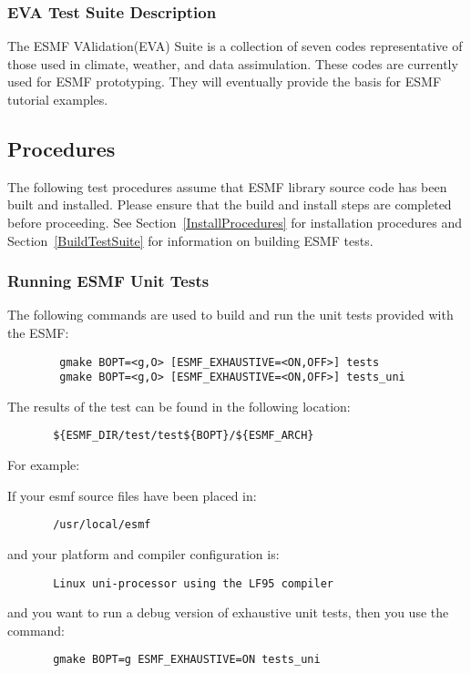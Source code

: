 \subsubsection{EVA Test Suite Description}
\label{EVATestDescription}

The ESMF VAlidation(EVA) Suite is a collection of seven codes representative of those used in climate, weather, and data assimulation. These codes are currently used for ESMF prototyping. They will eventually provide the basis for ESMF tutorial examples.

\subsection{Procedures}
\label{TestingProcedures}

The following test procedures assume that ESMF library source code has been built and installed. Please ensure that the build and install steps are completed before proceeding. See Section~\ref{InstallProcedures} for installation procedures and Section~\ref{BuildTestSuite} for information on building ESMF tests.  

\subsubsection{Running ESMF Unit Tests}
\label{RunUnitTests}

The following commands are used to build and run the unit tests provided with the ESMF:
\begin{verbatim}
        gmake BOPT=<g,O> [ESMF_EXHAUSTIVE=<ON,OFF>] tests
        gmake BOPT=<g,O> [ESMF_EXHAUSTIVE=<ON,OFF>] tests_uni
\end{verbatim}

The results of the test can be found in the following location:
\begin{verbatim}
       ${ESMF_DIR/test/test${BOPT}/${ESMF_ARCH}
\end{verbatim}

For example: 

If your esmf source files have been placed in: 
\begin{verbatim}
       /usr/local/esmf
\end{verbatim}

and your platform and compiler configuration is:
\begin{verbatim}
       Linux uni-processor using the LF95 compiler
\end{verbatim}

and you want to run a debug version of exhaustive unit tests,
then you use the command:
\begin{verbatim}
       gmake BOPT=g ESMF_EXHAUSTIVE=ON tests_uni
\end{verbatim}

